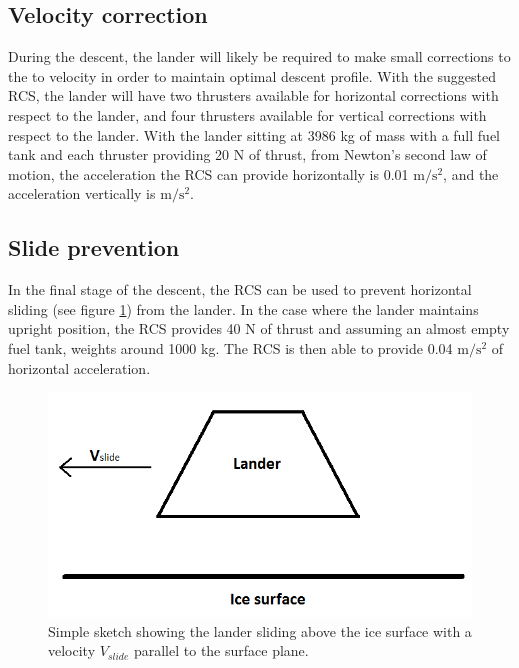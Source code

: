 \subsection{Velocity correction}

During the descent, the lander will likely be required to make small corrections to the to velocity in order to maintain optimal descent profile. With the suggested RCS, the lander will have two thrusters available for horizontal corrections with respect to the lander, and four thrusters available for vertical corrections with respect to the lander. With the lander sitting at 3986 kg of mass with a full fuel tank and each thruster providing 20 N of thrust, from Newton's second law of motion, the acceleration the RCS can provide horizontally is 0.01 $\mathrm{m/s^2}$, and the acceleration vertically is $\mathrm{m/s^2}$. 


\subsection{Slide prevention}

In the final stage of the descent, the RCS can be used to prevent horizontal sliding (see figure \ref{fig:lunar_slide}) from the lander. In the case where the lander maintains upright position, the RCS provides 40 N of thrust and assuming an almost empty fuel tank, weights around 1000 kg. The RCS is then able to provide 0.04 $\mathrm{m/s^2}$ of horizontal acceleration.\\

\begin{figure}[htb]
\begin{center}
\includegraphics[scale=0.8]{figures/RCS/Lunar_slide}
\caption{Simple sketch showing the lander sliding above the ice surface with a velocity $V_{slide}$ parallel to the surface plane.}
\label{fig:lunar_slide}
\end{center}
\end{figure}

